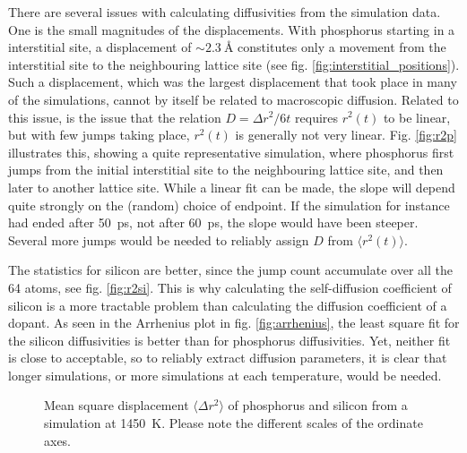 \documentclass[11pt,bibliography=totoc,index=totoc]{scrbook}   %
\begin{document}
There are several issues with calculating diffusivities from the simulation data.
One is the small magnitudes of the displacements. 
With phosphorus starting in a interstitial site, a displacement of $\sim \SI{2.3}{\angstrom}$ 
constitutes only a movement from the interstitial site to the neighbouring lattice site 
(see fig. \ref{fig:interstitial_positions}). 
Such a displacement, which was the largest displacement that took place in many of the simulations, 
cannot by itself be related to macroscopic diffusion.
Related to this issue, is the issue that the relation $D = \Delta r^2 / 6t$ requires $r^2(t)$ to be linear,
but with few jumps taking place, $r^2(t)$ is generally not very linear.
Fig. \ref{fig:r2p} illustrates this, showing a quite representative simulation, where phosphorus 
first jumps from the initial interstitial site to the neighbouring lattice site, and then later to another lattice site.
While a linear fit can be made, the slope will depend quite strongly on the (random) choice of endpoint. 
If the simulation for instance had ended after 50~ps, not after 60~ps, the slope would have been steeper.
Several more jumps would be needed to reliably assign $D$ from $\langle r^2 (t) \rangle$.

The statistics for silicon are better, since the jump count accumulate over all the 64 atoms, see fig. \ref{fig:r2si}.
This is why calculating the self-diffusion coefficient of silicon is a more tractable problem than calculating the diffusion coefficient of a dopant.
As seen in the Arrhenius plot in fig. \ref{fig:arrhenius}, the least square fit for the silicon diffusivities is better than for phosphorus diffusivities.
Yet, neither fit is close to acceptable, so to reliably extract diffusion parameters, 
it is clear that longer simulations, or more simulations at each temperature, would be needed.

\begin{figure}[htbp]
  \centering
    \caption{Mean square displacement $\langle \Delta r^2 \rangle$ of phosphorus and silicon from a simulation at \SI{1450}{\kelvin}. 
        Please note the different scales of the ordinate axes.}
  \label{fig:r2examples}
\end{figure}
\end{document}
